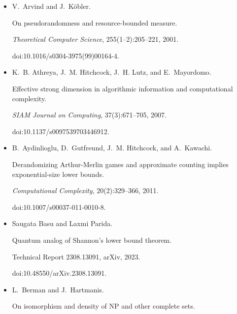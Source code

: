 \documentclass[10pt,a4paper]{article}
\begin{document}
\begin{itemize}
doi:10.1109/FOCS52979.2021.00062.





\item[] 
[6]

V. Arvind and J. Köbler.


On pseudorandomness and resource-bounded measure.


\emph{Theoretical Computer Science}, 255(1–2):205–221, 2001.


doi:10.1016/s0304-3975(99)00164-4.





\item[] 
[7]

K. B. Athreya, J. M. Hitchcock, J. H. Lutz, and E. Mayordomo.


Effective strong dimension in algorithmic information and
computational complexity.


\emph{SIAM Journal on Computing}, 37(3):671–705, 2007.


doi:10.1137/s0097539703446912.





\item[] 
[8]

B. Aydinlioglu, D. Gutfreund, J. M. Hitchcock, and A. Kawachi.


Derandomizing Arthur-Merlin games and approximate counting implies
exponential-size lower bounds.


\emph{Computational Complexity}, 20(2):329–366, 2011.


doi:10.1007/s00037-011-0010-8.





\item[] 
[9]

Saugata Basu and Laxmi Parida.


Quantum analog of Shannon’s lower bound theorem.


Technical Report 2308.13091, arXiv, 2023.


doi:10.48550/arXiv.2308.13091.





\item[] 
[10]

L. Berman and J. Hartmanis.


On isomorphism and density of NP and other complete sets.



\end{itemize}
\end{document}
